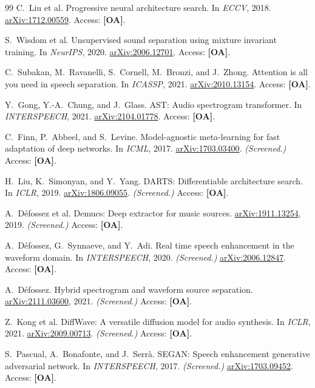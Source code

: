 \documentclass[10pt,twocolumn,letterpaper]{article}
\begin{document}
{\begin{thebibliography}{99}
C.~Liu et al.
\newblock Progressive neural architecture search.
\newblock In \emph{ECCV}, 2018.
\newblock \href{https://arxiv.org/abs/1712.00559}{arXiv:1712.00559}.
\newblock Access: \textbf{[OA]}.

S.~Wisdom et al.
\newblock Unsupervised sound separation using mixture invariant training.
\newblock In \emph{NeurIPS}, 2020.
\newblock \href{https://arxiv.org/abs/2006.12701}{arXiv:2006.12701}.
\newblock Access: \textbf{[OA]}.

C.~Subakan, M.~Ravanelli, S.~Cornell, M.~Bronzi, and J.~Zhong.
\newblock Attention is all you need in speech separation.
\newblock In \emph{ICASSP}, 2021.
\newblock \href{https://arxiv.org/abs/2010.13154}{arXiv:2010.13154}.
\newblock Access: \textbf{[OA]}.

Y.~Gong, Y.-A.~Chung, and J.~Glass.
\newblock AST: Audio spectrogram transformer.
\newblock In \emph{INTERSPEECH}, 2021.
\newblock \href{https://arxiv.org/abs/2104.01778}{arXiv:2104.01778}.
\newblock Access: \textbf{[OA]}.

C.~Finn, P.~Abbeel, and S.~Levine.
\newblock Model-agnostic meta-learning for fast adaptation of deep networks.
\newblock In \emph{ICML}, 2017.
\newblock \href{https://arxiv.org/abs/1703.03400}{arXiv:1703.03400}. \textit{(Screened.)}
\newblock Access: \textbf{[OA]}.

H.~Liu, K.~Simonyan, and Y.~Yang.
\newblock DARTS: Differentiable architecture search.
\newblock In \emph{ICLR}, 2019.
\newblock \href{https://arxiv.org/abs/1806.09055}{arXiv:1806.09055}. \textit{(Screened.)}
\newblock Access: \textbf{[OA]}.

A.~D\'efossez et al.
\newblock Demucs: Deep extractor for music sources.
\newblock \href{https://arxiv.org/abs/1911.13254}{arXiv:1911.13254}, 2019. \textit{(Screened.)}
\newblock Access: \textbf{[OA]}.

A.~D\'efossez, G.~Synnaeve, and Y.~Adi.
\newblock Real time speech enhancement in the waveform domain.
\newblock In \emph{INTERSPEECH}, 2020. \textit{(Screened.)}
\newblock \href{https://arxiv.org/abs/2006.12847}{arXiv:2006.12847}.
\newblock Access: \textbf{[OA]}.

A.~D\'efossez.
\newblock Hybrid spectrogram and waveform source separation.
\newblock \href{https://arxiv.org/abs/2111.03600}{arXiv:2111.03600}, 2021. \textit{(Screened.)}
\newblock Access: \textbf{[OA]}.

Z.~Kong et al.
\newblock DiffWave: A versatile diffusion model for audio synthesis.
\newblock In \emph{ICLR}, 2021.
\newblock \href{https://arxiv.org/abs/2009.00713}{arXiv:2009.00713}. \textit{(Screened.)}
\newblock Access: \textbf{[OA]}.

S.~Pascual, A.~Bonafonte, and J.~Serr\`a.
\newblock SEGAN: Speech enhancement generative adversarial network.
\newblock In \emph{INTERSPEECH}, 2017. \textit{(Screened.)}
\newblock \href{https://arxiv.org/abs/1703.09452}{arXiv:1703.09452}.
\newblock Access: \textbf{[OA]}.

\end{thebibliography}
}
\end{document}
